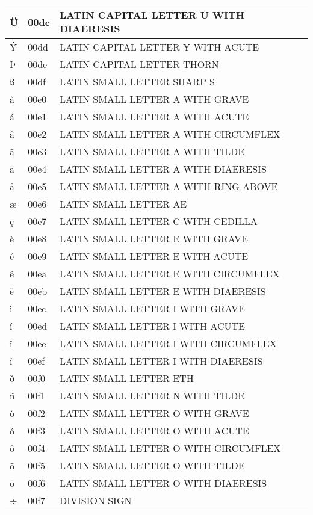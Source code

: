 \documentclass[12pt,letterpaper,openany]{book}
\begin{document}
\begin{center}
\begin{supertabular}{|m{0.25in}|m{0.5in}|m{4in}|}
			Ü & 00dc & LATIN CAPITAL LETTER U WITH DIAERESIS\\\hline
			Ý & 00dd & LATIN CAPITAL LETTER Y WITH ACUTE\\\hline
			Þ & 00de & LATIN CAPITAL LETTER THORN\\\hline
			ß & 00df & LATIN SMALL LETTER SHARP S\\\hline
			à & 00e0 & LATIN SMALL LETTER A WITH GRAVE\\\hline
			á & 00e1 & LATIN SMALL LETTER A WITH ACUTE\\\hline
			â & 00e2 & LATIN SMALL LETTER A WITH CIRCUMFLEX\\\hline
			ã & 00e3 & LATIN SMALL LETTER A WITH TILDE\\\hline
			ä & 00e4 & LATIN SMALL LETTER A WITH DIAERESIS\\\hline
			å & 00e5 & LATIN SMALL LETTER A WITH RING ABOVE\\\hline
			æ & 00e6 & LATIN SMALL LETTER AE\\\hline
			ç & 00e7 & LATIN SMALL LETTER C WITH CEDILLA\\\hline
			è & 00e8 & LATIN SMALL LETTER E WITH GRAVE\\\hline
			é & 00e9 & LATIN SMALL LETTER E WITH ACUTE\\\hline
			ê & 00ea & LATIN SMALL LETTER E WITH CIRCUMFLEX\\\hline
			ë & 00eb & LATIN SMALL LETTER E WITH DIAERESIS\\\hline
			ì & 00ec & LATIN SMALL LETTER I WITH GRAVE\\\hline
			í & 00ed & LATIN SMALL LETTER I WITH ACUTE\\\hline
			î & 00ee & LATIN SMALL LETTER I WITH CIRCUMFLEX\\\hline
			ï & 00ef & LATIN SMALL LETTER I WITH DIAERESIS\\\hline
			ð & 00f0 & LATIN SMALL LETTER ETH\\\hline
			ñ & 00f1 & LATIN SMALL LETTER N WITH TILDE\\\hline
			ò & 00f2 & LATIN SMALL LETTER O WITH GRAVE\\\hline
			ó & 00f3 & LATIN SMALL LETTER O WITH ACUTE\\\hline
			ô & 00f4 & LATIN SMALL LETTER O WITH CIRCUMFLEX\\\hline
			õ & 00f5 & LATIN SMALL LETTER O WITH TILDE\\\hline
			ö & 00f6 & LATIN SMALL LETTER O WITH DIAERESIS\\\hline
			÷ & 00f7 & DIVISION SIGN\\\hline

\end{supertabular}
\end{center}
\end{document}
